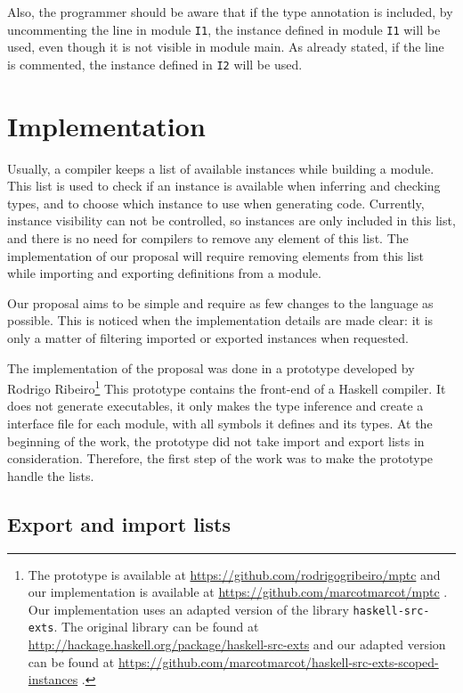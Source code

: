 \documentclass[msc]{ppgccufmg}
\begin{document}
Also, the programmer should be aware that if the type annotation is
included, by uncommenting the line in module \texttt{I1}, the instance
defined in module \texttt{I1} will be used, even though it is not
visible in module main.  As already stated, if the line is commented,
the instance defined in \texttt{I2} will be used.

\section{Implementation}
\label{Implementation}
Usually, a compiler keeps a list of available instances while building a
module.  This list is used to check if an instance is available when inferring and
checking types, and to choose which instance to use when generating code.
Currently, instance visibility can not be controlled, so instances are only
included in this list, and there is no need for compilers to remove any element
of this list.  The implementation of our proposal will require removing
elements from this list while importing and exporting definitions from a module.

Our proposal aims to be simple and require as few changes to the
language as possible. This is noticed when the implementation details
are made clear: it is only a matter of filtering imported or exported
instances when requested.

The implementation of the proposal was done in a prototype developed by Rodrigo Ribeiro\footnote{The prototype is available at \url{https://github.com/rodrigogribeiro/mptc} and our implementation is available at \url{https://github.com/marcotmarcot/mptc} .  Our implementation uses an adapted version of the library \texttt{haskell-src-exts}.  The original library can be found at \url{http://hackage.haskell.org/package/haskell-src-exts} and our adapted version can be found at \url{https://github.com/marcotmarcot/haskell-src-exts-scoped-instances} .}
This prototype contains the front-end of a Haskell compiler.
It does not generate executables, it only makes the type inference and create a interface file for each module, with all symbols it defines and its types.
At the beginning of the work, the prototype did not take import and export lists in consideration.
Therefore, the first step of the work was to make the prototype handle the lists.

\subsection{Export and import lists}
\end{document}
